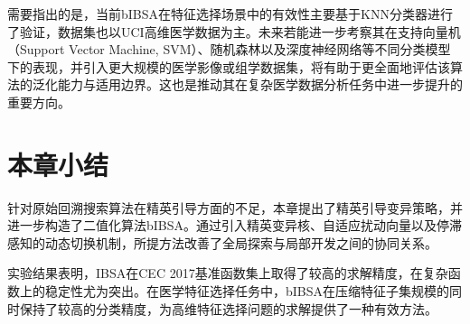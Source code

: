 需要指出的是，当前bIBSA在特征选择场景中的有效性主要基于KNN分类器进行了验证，数据集也以UCI高维医学数据为主。未来若能进一步考察其在支持向量机（Support Vector Machine, SVM）、随机森林以及深度神经网络等不同分类模型下的表现，并引入更大规模的医学影像或组学数据集，将有助于更全面地评估该算法的泛化能力与适用边界。这也是推动其在复杂医学数据分析任务中进一步提升的重要方向。

\section{本章小结}

针对原始回溯搜索算法在精英引导方面的不足，本章提出了精英引导变异策略，并进一步构造了二值化算法bIBSA。通过引入精英变异核、自适应扰动向量以及停滞感知的动态切换机制，所提方法改善了全局探索与局部开发之间的协同关系。

实验结果表明，IBSA在CEC 2017基准函数集上取得了较高的求解精度，在复杂函数上的稳定性尤为突出。在医学特征选择任务中，bIBSA在压缩特征子集规模的同时保持了较高的分类精度，为高维特征选择问题的求解提供了一种有效方法。

\endinput %
